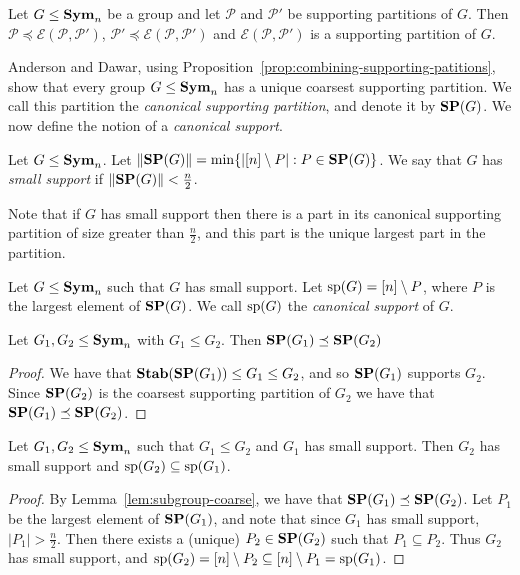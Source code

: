 \documentclass[../paper.tex]{subfiles}
\begin{document}
\begin{prop}
  \label{prop:combining-supporting-patitions}
  Let $G \leq \text{\textbf{Sym}}_n$ be a group and let $\mathcal{P}$ and $\mathcal{P}'$ be
  supporting partitions of $G$. Then $\mathcal{P} \preceq
  \mathcal{E}(\mathcal{P}, \mathcal{P}')$, $ \mathcal{P}' \preceq
  \mathcal{E}(\mathcal{P}, \mathcal{P}')$ and $\mathcal{E}(\mathcal{P},
  \mathcal{P}')$ is a supporting partition of $G$.
\end{prop}

Anderson and Dawar, using Proposition~\ref{prop:combining-supporting-patitions},
show that every group $G \leq \text{\textbf{Sym}}_n$ has a unique coarsest supporting partition.
We call this partition the \emph{canonical supporting partition}, and denote it
by $\text{\textbf{SP}} (G)$. We now define the notion of a \emph{canonical support}.

\begin{definition}
  Let $G \leq \text{\textbf{Sym}}_n$. Let $\| \text{\textbf{SP}}(G) \| = \min \{\vert [n] \setminus P \vert :
  P \in \text{\textbf{SP}}(G) \}$. We say that $G$ has \emph{small support} if $\| \text{\textbf{SP}}(G) \| <
  \frac{n}{2}$.
\end{definition}

Note that if $G$ has small support then there is a part in its canonical
supporting partition of size greater than $\frac{n}{2}$, and this part is the
unique largest part in the partition.

\begin{definition}
  Let $G \leq \text{\textbf{Sym}}_n$ such that $G$ has small support. Let $\text{sp}(G) = [n]
  \setminus P$, where $P$ is the largest element of $\text{\textbf{SP}}(G)$. We call
  $\text{sp}(G)$ the \emph{canonical support} of $G$.
\end{definition}

\begin{lem}\label{lem:subgroup-coarse}
  Let $G_1, G_2 \leq \text{\textbf{Sym}}_n$ with $G_1 \leq G_2$. Then $\text{\textbf{SP}}(G_1) \preceq
  \text{\textbf{SP}}(G_2)$
\end{lem}
\begin{proof}
  We have that $\text{\textbf{Stab}}(\text{\textbf{SP}}(G_1)) \leq G_1 \leq G_2$, and so $\text{\textbf{SP}}(G_1)$ supports
  $G_2$. Since $\text{\textbf{SP}}(G_2)$ is the coarsest supporting partition of $G_2$ we have
  that $\text{\textbf{SP}}(G_1) \preceq \text{\textbf{SP}}(G_2)$.
\end{proof}

\begin{lem}
  Let $G_1, G_2 \leq \text{\textbf{Sym}}_n$ such that $G_1 \leq G_2$ and $G_1$ has small
  support. Then $G_2$ has small support and $\text{sp}(G_2) \subseteq \text{sp}(G_1)$.
  \label{lem:support-containment}
\end{lem}
\begin{proof}
  By Lemma~\ref{lem:subgroup-coarse}, we have that $\text{\textbf{SP}}(G_1) \preceq \text{\textbf{SP}}(G_2)$.
  Let $P_1$ be the largest element of $\text{\textbf{SP}}(G_1)$, and note that since $G_1$ has
  small support, $\vert P_1 \vert > \frac{n}{2}$. Then there exists a (unique)
  $P_2 \in \text{\textbf{SP}}(G_2)$ such that $P_1 \subseteq P_2$. Thus $G_2$ has small
  support, and $\text{sp}(G_2) = [n] \setminus P_2 \subseteq [n] \setminus P_1 =
  \text{sp}(G_1)$.
\end{proof}
\end{document}

